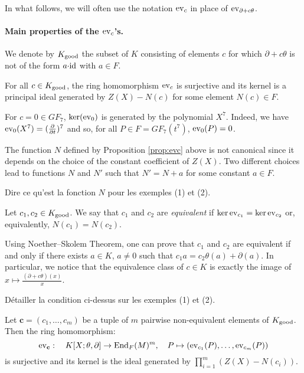\documentclass[a4paper]{llncs}
\def\todo#1{{\color{todo} #1}}
\newcommand{\id}{\textrm{\rm id}}
\newcommand{\End}{\textrm{\rm End}}
\newcommand{\ev}[1]{\textrm{\rm ev}_{#1}}
\newcommand{\bc}{\textbf{c}}
\newcommand{\good}{\textrm{\rm good}}
\begin{document}
In what follows, we will often use the notation $\ev c$ in place of 
$\ev{\partial + c \theta}$.

\paragraph{Main properties of the $\ev c$'s.}

We denote by $K_\good$ the subset of $K$ consisting of elements $c$ for 
which $\partial + c\theta$ is not of the form $a{\cdot}\id$ with $a \in 
F$.

\begin{proposition}
\label{prop:evc}
For all $c \in K_\good$, the ring homomorphism $\ev{c}$ is surjective
and its kernel is a principal ideal generated by $Z(X) - N(c)$
for some element $N(c) \in F$.
\end{proposition}

\begin{example}
For $c = 0 \in GF_7$, $\ker (\ev 0)$ is generated by the polynomial $X^7$. Indeed, we have $\ev 0 (X^7) = (\frac{\partial}{\partial t})^7$ and so, for all $P \in F = GF_7(t^7)$, $\ev 0 (P) = 0$.
\end{example}


\begin{remark}
The function $N$ defined by Proposition \ref{prop:evc} above is not 
canonical since it depends on the choice of the constant coefficient 
of $Z(X)$. Two different choices lead to functions $N$ and $N'$ such
that $N' = N + a$ for some constant $a \in F$.
\end{remark}

\todo{Dire ce qu'est la fonction $N$ pour les exemples (1) et (2).}

\begin{definition}
\label{def:equiv}
Let $c_1, c_2 \in K_\good$.
We say that $c_1$ and $c_2$ are \emph{equivalent} if
$\ker \ev{c_1} = \ker \ev{c_2}$ or, equivalently, $N(c_1) = N(c_2)$.
\end{definition}

Using Noether--Skolem Theorem, one can prove that $c_1$ and $c_2$ are 
equivalent if and only if there exists $a \in K$, $a \neq 0$ such that 
$c_1 a = c_2 \theta(a) + \partial(a)$. In particular, we notice that the 
equivalence class of $c \in K$ is exactly the image of $x \mapsto 
\frac{(\partial + c\theta)(x)} x$.

\todo{Détailler la condition ci-dessus sur les exemples (1) et (2).}

\begin{proposition}
\label{prop:evbc}
Let $\bc = (c_1, \ldots, c_m)$ be a tuple of $m$ pairwise non-equivalent 
elements of $K_\good$.
Then the ring homomorphism:
$$\ev \bc : \quad K[X;\theta,\partial] \to \End_F(M)^m, \quad
P \mapsto (\ev{c_1}(P), \ldots, \ev{c_m}(P))$$
is surjective and its kernel is the ideal generated by
$\prod_{i=1}^m (Z(X) - N(c_i))$.
\end{proposition}
\end{document}
